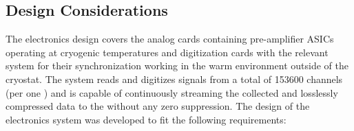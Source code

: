 \subsection{Design Considerations}
\label{sec:fddp-tpc-elec-des-consid}


The  electronics design covers the analog  cards containing pre-amplifier ASICs operating at cryogenic temperatures and digitization cards with the relevant system for their synchronization working in the warm environment outside of the cryostat. The system %
reads and digitizes signals from a total of \num{153600} channels (per one ) and is capable of continuously streaming the collected and losslessly compressed data to the  without any zero suppression. 
The design of the  electronics system was developed to fit the following requirements:
